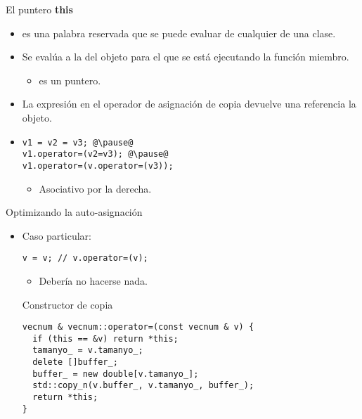 \begin{frame}[t,fragile]{El puntero \textbf{this}}
\begin{itemize}
  \item {} es una palabra reservada que se puede evaluar
         de cualquier  de una clase.

  \item Se evalúa a la  del objeto para el que se 
        está ejecutando la función miembro.
    \begin{itemize}
      \item {} es un puntero.
    \end{itemize}

  \item La expresión  en el operador de asignación de copia devuelve una referencia la objeto.

  \item {}
\begin{lstlisting}[escapechar=@]
v1 = v2 = v3; @\pause@
v1.operator=(v2=v3); @\pause@
v1.operator=(v.operator=(v3));
\end{lstlisting}
    \begin{itemize}
      \item Asociativo por la derecha.
    \end{itemize}
\end{itemize}
\end{frame}

\begin{frame}[t,fragile]{Optimizando la auto-asignación}
\begin{itemize}
  \item Caso particular: 
\begin{lstlisting}
v = v; // v.operator=(v);
\end{lstlisting}
    \begin{itemize}
      \item Debería no hacerse nada.
    \end{itemize}

\begin{block}{Constructor de copia}
\begin{lstlisting}
vecnum & vecnum::operator=(const vecnum & v) {
  if (this == &v) return *this;
  tamanyo_ = v.tamanyo_;
  delete []buffer_;
  buffer_ = new double[v.tamanyo_];
  std::copy_n(v.buffer_, v.tamanyo_, buffer_);
  return *this;
}
\end{lstlisting}
\end{block}
\end{itemize}
\end{frame}

